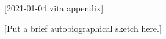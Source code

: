 [2021-01-04 vita appendix]

%
%
%

\begin{vita}

[Put a brief autobiographical sketch here.]

\end{vita}
